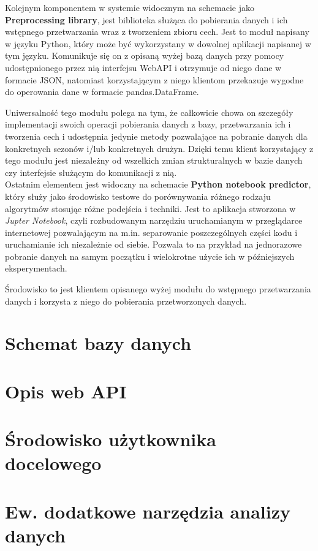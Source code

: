 Kolejnym komponentem w systemie widocznym na schemacie jako \textbf{Preprocessing library}, jest biblioteka służąca do pobierania danych i ich wstępnego przetwarzania wraz z tworzeniem zbioru cech. Jest to moduł napisany w języku Python, który może być wykorzystany w dowolnej aplikacji napisanej w tym języku. Komunikuje się on z opisaną wyżej bazą danych przy pomocy udostępnionego przez nią interfejsu WebAPI i otrzymuje od niego dane w formacie JSON, natomiast korzystającym z niego klientom przekazuje wygodne do operowania dane w formacie pandas.DataFrame. 

Uniwersalność tego modułu polega na tym, że całkowicie chowa on szczegóły implementacji swoich operacji pobierania danych z bazy, przetwarzania ich i tworzenia cech i udostępnia jedynie metody pozwalające na pobranie danych dla konkretnych sezonów i/lub konkretnych drużyn. Dzięki temu klient korzystający z tego modułu jest niezależny od wszelkich zmian strukturalnych w bazie danych czy interfejsie służącym do komunikacji z nią.\\


Ostatnim elementem jest widoczny na schemacie \textbf{Python notebook predictor}, który służy jako środowisko testowe do porównywania różnego rodzaju algorytmów stosując różne podejścia i techniki. Jest to aplikacja stworzona w \textit{Jupter Notebook}, czyli rozbudowanym narzędziu uruchamianym w przeglądarce internetowej pozwalającym na m.in. separowanie poszczególnych części kodu i uruchamianie ich niezależnie od siebie. Pozwala to na przykład na jednorazowe pobranie danych na samym początku i wielokrotne użycie ich w późniejszych eksperymentach.

Środowisko to jest klientem opisanego wyżej modułu do wstępnego przetwarzania danych i korzysta z niego do pobierania przetworzonych danych. 


\section{Schemat bazy danych}
\label{database_schema}
\section{Opis web API}
\section{Środowisko użytkownika docelowego}
\section{Ew. dodatkowe narzędzia analizy danych}